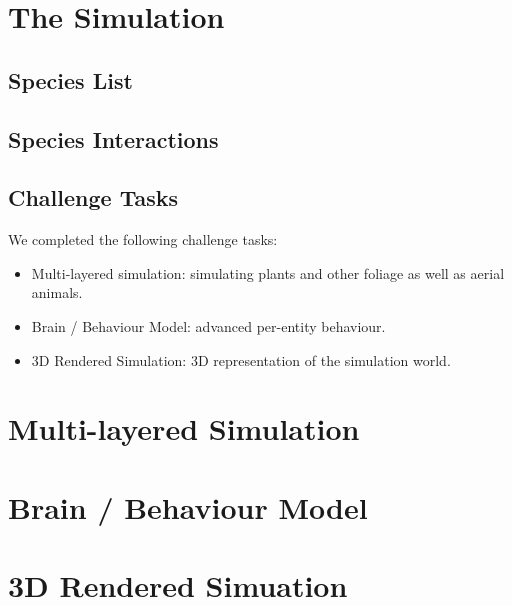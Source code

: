 \documentclass{article}
\begin{document}
    \begin{multicols}{2}
        \section{The Simulation}

        \subsection{Species List}

        \subsection{Species Interactions}
        
        \subsection{Challenge Tasks}

            We completed the following challenge tasks:

            \begin{itemize}
                \item Multi-layered simulation: simulating plants and other foliage as well as aerial animals.
                \item Brain / Behaviour Model: advanced per-entity behaviour.
                \item 3D Rendered Simulation: 3D representation of the simulation world.
            \end{itemize}

        \section{Multi-layered Simulation}

        \section{Brain / Behaviour Model}

        \section{3D Rendered Simuation}


\end{multicols}
\end{document}
